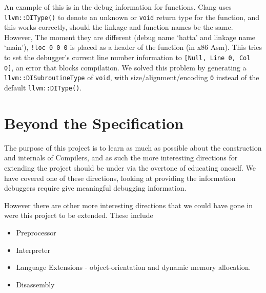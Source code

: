 \documentclass[a4wide, 11pt]{article}
\begin{document}
An example of this is in the debug information for functions. Clang uses \texttt{llvm::DIType()} to denote an unknown or \texttt{void} return type for the function, and this works correctly, should the linkage and function names be the same. However, The moment they are different (debug name `hatta' and linkage name `main'), \texttt{!loc 0 0 0} is placed as a header of the function (in x86 Asm). This tries to set the debugger's current line number information to \texttt{[Null, Line 0, Col 0]}, an error that blocks compilation. We solved this problem by generating a \texttt{llvm::DISubroutineType} of \texttt{void}, with size/alignment/encoding \texttt{0} instead of the default \texttt{llvm::DIType()}. 

\section{Beyond the Specification}

The purpose of this project is to learn as much as possible about the construction and internals of Compilers, and as such the more interesting directions for extending the project should be under via the overtone of educating oneself. We have covered one of these directions, looking at providing the information debuggers require give meaningful debugging information. 

However there are other more interesting directions that we could have gone in were this project to be extended. These include
\begin{itemize}
\item Preprocessor
\item Interpreter
\item Language Extensions - object-orientation and dynamic memory allocation.
\item Disassembly
\end{itemize}
\end{document}
